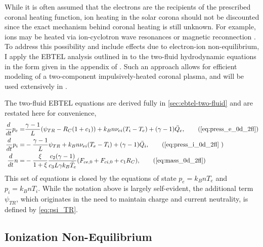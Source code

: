 While it is often assumed that the electrons are the recipients of the prescribed coronal heating function, ion heating in the solar corona should not be discounted since the exact mechanism behind coronal heating is still unknown. For example, ions may be heated via ion-cyclotron wave resonances \citep[e.g.][]{markovskii_intermittent_2004} or magnetic reconnection \citep[e.g.][]{ono_ion_1996,drake_onset_2014}. To address this possibility and include effects due to electron-ion non-equilibrium, I apply the EBTEL analysis outlined in \citet{klimchuk_highly_2008} to the two-fluid hydrodynamic equations in the form given in the appendix of \citet{bradshaw_influence_2013}. Such an approach allows for efficient modeling of a two-component impulsively-heated coronal plasma, and will be used extensively in .

The two-fluid EBTEL equations are derived fully in \autoref{sec:ebtel-two-fluid} and are restated here for convenience,
\begin{align}
    \frac{d}{dt}p_e =& \frac{\gamma - 1}{L}(\psi_{TR} - R_C(1 + c_1)) + k_Bn\nu_{ei}(T_i - T_e) + (\gamma - 1)\bar{Q}_e,\tag{\ref{eq:press_e_0d_2fl}} \\
    \frac{d}{dt}p_i =& -\frac{\gamma - 1}{L}\psi_{TR} + k_Bn\nu_{ei}(T_e - T_i) + (\gamma - 1)\bar{Q}_i,\tag{\ref{eq:press_i_0d_2fl} }\\
    \frac{d}{dt}n =& -\frac{\xi}{1+\xi}\frac{c_2(\gamma - 1)}{c_3L\gamma k_B\bar{T}_e}(F_{ce,0} + F_{ci,0} + c_1R_C),\tag{\ref{eq:mass_0d_2fl}}
\end{align}
This set of equations is closed by the equations of state $p_e=k_BnT_e$ and $p_i=k_BnT_i$. While the notation above is largely self-evident, the additional term $\psi_{TR}$, which originates in the need to maintain charge and current neutrality, is defined by \autoref{eq:psi_TR}.

\subsection{Ionization Non-Equilibrium}\label{hot-plasma:subsec:nei_theory}


